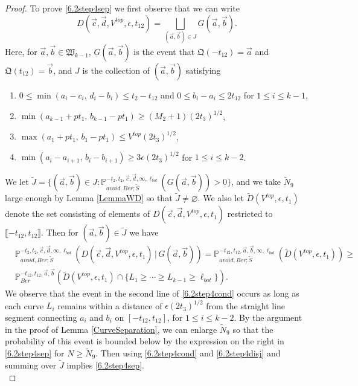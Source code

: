 \begin{proof}
	To prove \eqref{6.2step4sep} we first observe that we can write
	\begin{equation}\label{6.2step4disj}
	D(\vec c, \vec d, V^{top}, \epsilon,t_{12}) = \bigsqcup_{(\vec{a},\vec{b})\in J} G(\vec{a},\vec{b}).
	\end{equation}
	Here, for $\vec{a},\vec{b}\in\mathfrak{W}_{k-1}$, $G(\vec{a},\vec{b})$ is the event that $\mathfrak{Q}(-t_{12}) = \vec{a}$ and $\mathfrak{Q}(t_{12}) = \vec{b}$, and $J$ is the collection of $(\vec{a},\vec{b})$ satisfying
	\begin{enumerate}[label = (\arabic*)]
		
		\item $ 0 \leq \min(a_i - c_i,\, d_i - b_i) \leq t_2 - t_{12}$ and $0\leq b_i-a_i \leq 2t_{12}$ for $1\leq i\leq k-1$,
		
		\item $\min(a_{k-1} + pt_1,\, b_{k-1} - pt_1) \geq (M_2+1)(2t_3)^{1/2}$,
		
		\item $\max(a_1 + pt_1,\, b_1 - pt_1) \leq V^{top}(2t_3)^{1/2}$,
		
		\item $\min(a_i-a_{i+1}, \, b_i-b_{i+1}) \geq 3\epsilon(2t_3)^{1/2}$ for $1\leq i\leq k-2$.
		
	\end{enumerate}
	We let $\tilde{J} = \{(\vec{a},\vec{b})\in J : \mathbb{P}^{-t_2,t_2,\vec{c},\vec{d},\infty,\ell_{bot}}_{avoid,Ber;\tilde S}(G(\vec{a},\vec{b})) > 0\}$, and we take $\tilde{N}_9$ large enough by Lemma \ref{LemmaWD} so that $\tilde{J}\neq\varnothing$. We also let $\tilde{D}(V^{top},\epsilon,t_1)$ denote the set consisting of elements of $D(\vec{c},\vec{d},V^{top},\epsilon,t_1)$ restricted to $\llbracket -t_{12},t_{12}\rrbracket$. Then for $(\vec{a},\vec{b})\in\tilde{J}$ we have
	\begin{equation}\label{6.2step4cond}
	\begin{split}
	&\mathbb{P}^{-t_2,t_2,\vec{c},\vec{d},\infty,\ell_{bot}}_{avoid,Ber;\tilde S}\left(D(\vec{c},\vec{d},V^{top},\epsilon,t_1) \,\big|\,G(\vec{a},\vec{b})\right) = \mathbb{P}^{-t_{12},t_{12},\vec{a},\vec{b},\infty,\ell_{bot}}_{avoid,Ber;\tilde S}\left(\tilde D(V^{top},\epsilon,t_1)\right) \geq \\
	&\mathbb{P}^{-t_{12},t_{12},\vec{a},\vec{b}}_{Ber}\left(\tilde D(V^{top},\epsilon,t_1)\cap \{L_1\geq\cdots\geq L_{k-1}\geq\ell_{bot}\}\right).
	\end{split}
	\end{equation}
	We observe that the event in the second line of \eqref{6.2step4cond} occurs as long as each curve $L_i$ remains within a distance of $\epsilon(2t_3)^{1/2}$ from the straight line segment connecting $a_i$ and $b_i$ on $[-t_{12},t_{12}]$, for $1\leq i\leq k-2$. By the argument in the proof of Lemma \ref{CurveSeparation}, we can enlarge $\tilde{N}_9$ so that the probability of this event is bounded below by the expression on the right in \eqref{6.2step4sep} for $N\geq\tilde{N}_9$. Then using \eqref{6.2step4cond} and \eqref{6.2step4disj} and summing over $\tilde{J}$ implies \eqref{6.2step4sep}.\\
	

\end{proof}
